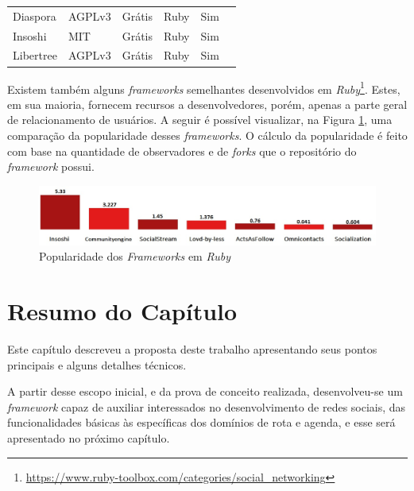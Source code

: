 \begin{table}[]
\begin{adjustbox}{width=\textwidth}
\begin{tabular}{@{}llllll@{}}
Diaspora              & AGPLv3           & Grátis                & Ruby                & Sim                                                      \\
Insoshi               & MIT              & Grátis                & Ruby                & Sim                                                      \\
Libertree             & AGPLv3           & Grátis                & Ruby                & Sim                                                      \\ \bottomrule
\end{tabular}
\end{adjustbox}
\end{table}

Existem também alguns \textit{frameworks} semelhantes desenvolvidos em \textit{Ruby}\footnote{\url{https://www.ruby-toolbox.com/categories/social_networking}}. Estes, em sua maioria, fornecem recursos a desenvolvedores, porém, apenas a parte geral de relacionamento de usuários. A seguir é possível visualizar, na Figura \ref{ruby_social_network}, uma comparação da popularidade desses \textit{frameworks}. O cálculo da popularidade é feito com base na quantidade de observadores e de \textit{forks} que o repositório do \textit{framework} possui.

\begin{figure}[!h]
	\centering
	\includegraphics[scale=0.45]{figuras/proposta/ruby_social_network.eps}
	\caption{Popularidade dos \textit{Frameworks} em \textit{Ruby}}
	\label{ruby_social_network}
\end{figure}

\section{Resumo do Capítulo}

Este capítulo descreveu a proposta deste trabalho apresentando seus pontos principais e alguns detalhes técnicos.

A partir desse escopo inicial, e da prova de conceito realizada, desenvolveu-se um \textit{framework}  capaz de auxiliar interessados no desenvolvimento de redes sociais, das funcionalidades básicas às específicas dos domínios de rota e agenda, e esse será apresentado no próximo capítulo.
